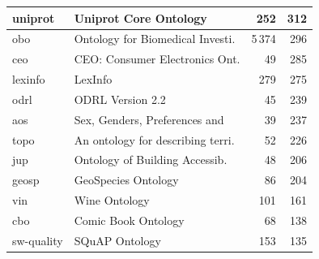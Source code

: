 \begin{table}[h]
\begin{tabular}{|l|l|r|r|}
uniprot    & Uniprot Core Ontology                                                                           & 252  & 312  \\ \hline
obo        & Ontology for Biomedical Investi.                                                                & 5\,374 & 296  \\ \hline
ceo        & CEO: Consumer Electronics Ont.                                                                  & 49   & 285  \\ \hline
lexinfo    & LexInfo                                                                                         & 279  & 275  \\ \hline
odrl       & ODRL Version 2.2                                                                                & 45   & 239  \\ \hline
aos        & Sex, Genders, Preferences and                                                                   & 39   & 237  \\ \hline
topo       & An ontology for describing terri.                                                               & 52   & 226  \\ \hline
jup        & Ontology of Building Accessib.                                                                  & 48   & 206  \\ \hline
geosp      & GeoSpecies Ontology                                                                             & 86   & 204  \\ \hline
vin        & Wine Ontology                                                                                   & 101  & 161  \\ \hline
cbo        & Comic Book Ontology                                                                             & 68   & 138  \\ \hline
sw-quality & SQuAP Ontology                                                                                  & 153  & 135  \\ \hline

\end{tabular}
\end{table}
